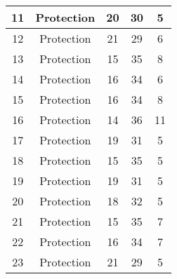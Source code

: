 \documentclass[results.tex]{subfiles}
\begin{document}
\begin{center}
\begin{tabular}{| c || c | c | c | c |}
            \hline
            11                      & Protection                   & 20                     & 30                      & 5                    \\
            \hline
            12                      & Protection                   & 21                     & 29                      & 6                    \\
            \hline
            13                      & Protection                   & 15                     & 35                      & 8                    \\
            \hline
            14                      & Protection                   & 16                     & 34                      & 6                    \\
            \hline
            15                      & Protection                   & 16                     & 34                      & 8                    \\
            \hline
            16                      & Protection                   & 14                     & 36                      & 11                   \\
            \hline
            17                      & Protection                   & 19                     & 31                      & 5                    \\
            \hline
            18                      & Protection                   & 15                     & 35                      & 5                    \\
            \hline
            19                      & Protection                   & 19                     & 31                      & 5                    \\
            \hline
            20                      & Protection                   & 18                     & 32                      & 5                    \\
            \hline
            21                      & Protection                   & 15                     & 35                      & 7                    \\
            \hline
            22                      & Protection                   & 16                     & 34                      & 7                    \\
            \hline
            23                      & Protection                   & 21                     & 29                      & 5                    \\

\end{tabular}
\end{center}
\end{document}
